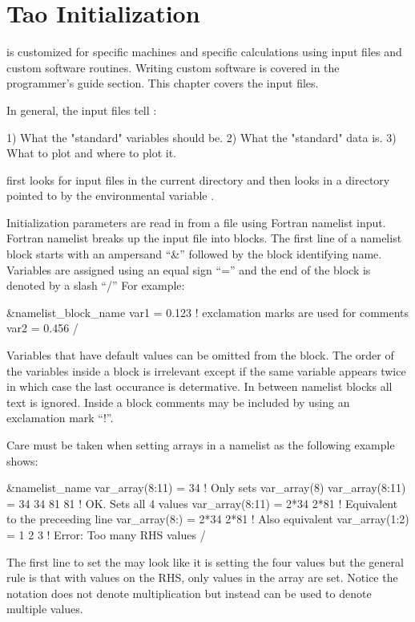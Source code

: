 \chapter{Tao Initialization}
\label{c:init}

\tao is customized for specific machines and specific calculations
using input files and custom software routines. Writing custom
software is covered in the programmer's guide section. This chapter
covers the input files.

In general, the input files tell \tao:
\begin{example}
  1) What the "standard" variables should be.
  2) What the "standard" data is.
  3) What to plot and where to plot it.
\end{example}

\tao first looks for input files in the current directory and then
looks in a directory pointed to by the environmental variable
.

Initialization parameters are read in from a file using Fortran
namelist input. Fortran namelist breaks up the input file into
blocks. The first line of a namelist block starts with an ampersand
``\&'' followed by the block identifying name. Variables are assigned
using an equal sign ``='' and the end of the block is denoted by a
slash ``/'' For example:
\begin{example}
  &namelist_block_name
    var1 = 0.123   ! exclamation marks are used for comments
    var2 = 0.456
  /
\end{example}
Variables that have default values can be omitted from the block.  The
order of the variables inside a block is irrelevant except if the
same variable appears twice in which case the last occurance is determative.
In between namelist blocks all text is ignored. Inside a block comments may be
included by using an exclamation mark ``!''.

Care must be taken when setting arrays in a namelist as the following example
shows:
\begin{example}
  &namelist_name
    var_array(8:11) = 34             ! Only sets var_array(8)
    var_array(8:11) = 34 34 81 81    ! OK. Sets all 4 values
    var_array(8:11) = 2*34 2*81      ! Equivalent to the preceeding line
    var_array(8:)   = 2*34 2*81      ! Also equivalent
    var_array(1:2) = 1 2 3           ! Error: Too many RHS values
  /
\end{example}
The first line to set the  may look like it is setting 
the four values  but the general rule is that with 
values on the RHS, only  values in the array are set. Notice the notation
 does not denote multiplication but instead can be used to denote
multiple values.

